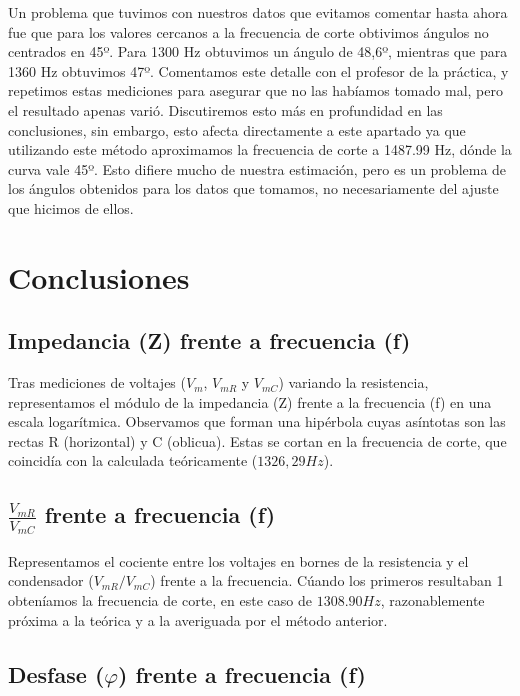 \documentclass[12pt, a4paper, titlepage]{article}
\begin{document}
  Un problema que tuvimos con nuestros datos que evitamos comentar hasta ahora fue que para los valores cercanos a la frecuencia de corte obtivimos ángulos no centrados en 45º. Para 1300 Hz obtuvimos un ángulo de 48,6º, mientras que para 1360 Hz obtuvimos 47º. Comentamos este detalle con el profesor de la práctica, y repetimos estas mediciones para asegurar que no las habíamos tomado mal, pero el resultado apenas varió. Discutiremos esto más en profundidad en las conclusiones, sin embargo, esto afecta directamente a este apartado ya que utilizando este método aproximamos la frecuencia de corte a 1487.99 Hz, dónde la curva vale 45º. Esto difiere mucho de nuestra estimación, pero es un problema de los ángulos obtenidos para los datos que tomamos, no necesariamente del ajuste que hicimos de ellos.


  \newpage
  \section{Conclusiones}

  \subsection{Impedancia (Z) frente a frecuencia (f)}

  Tras mediciones de voltajes ($V_m$, $V_{mR}$ y $V_{mC}$) variando la resistencia, representamos el módulo de la impedancia (Z) frente a la frecuencia (f) en una escala logarítmica. Observamos que forman una hipérbola cuyas asíntotas son las rectas R (horizontal) y C (oblicua). Estas se cortan en la frecuencia de corte, que coincidía con la calculada teóricamente ($1326, 29 Hz$).

  \subsection{$\frac{V_{mR}}{V_{mC}}$ frente a frecuencia (f)}

  Representamos el cociente entre los voltajes en bornes de la resistencia y el condensador ($V_{mR}/V_{mC}$) frente a la frecuencia. Cúando los primeros resultaban 1 obteníamos la frecuencia de corte, en este caso de $1308.90 Hz$, razonablemente próxima a la teórica y a la averiguada por el método anterior.

  \subsection{Desfase ($\varphi$) frente a frecuencia (f)}
\end{document}
